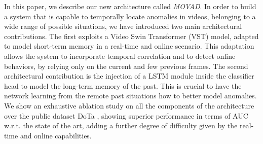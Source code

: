 In this paper, we describe our new architecture called \emph{MOVAD}.
In order to build a system that is capable to temporally locate anomalies in videos, belonging to a wide range of possible situations, we have introduced two main architectural contributions.
The first exploits a Video Swin Transformer \cite{liu_video_2022} (VST) model, adapted to model short-term memory in a real-time and online scenario.
This adaptation allows the system to incorporate temporal correlation and to detect online behaviors, by relying only on the current and few previous frames.
The second architectural contribution is the injection of a LSTM module inside the classifier head to model the long-term memory of the past.
This is crucial to have the network learning from the remote past situations how to better model anomalies.
We show an exhaustive ablation study on all the components of the architecture over the public dataset DoTa \cite{9712446}, showing superior performance in terms of AUC w.r.t. the state of the art, adding a further degree of difficulty given by the real-time and online capabilities.